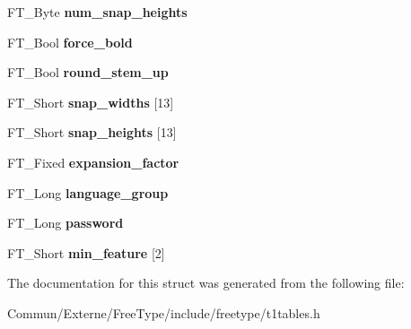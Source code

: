\begin{DoxyCompactItemize}
\item 
F\+T\+\_\+\+Byte {\bfseries num\+\_\+snap\+\_\+heights}\hypertarget{struct_p_s___private_rec___a53f7cfd204400a00eb7203b67d6a1b1c}{}\label{struct_p_s___private_rec___a53f7cfd204400a00eb7203b67d6a1b1c}

\item 
F\+T\+\_\+\+Bool {\bfseries force\+\_\+bold}\hypertarget{struct_p_s___private_rec___a40e62a278e48f47a0f204bd9fa5c883f}{}\label{struct_p_s___private_rec___a40e62a278e48f47a0f204bd9fa5c883f}

\item 
F\+T\+\_\+\+Bool {\bfseries round\+\_\+stem\+\_\+up}\hypertarget{struct_p_s___private_rec___a96b9729811d02146a87ffdc5c254bbe9}{}\label{struct_p_s___private_rec___a96b9729811d02146a87ffdc5c254bbe9}

\item 
F\+T\+\_\+\+Short {\bfseries snap\+\_\+widths} \mbox{[}13\mbox{]}\hypertarget{struct_p_s___private_rec___a39cf1a4b21280bf8082ccba0f4824a8a}{}\label{struct_p_s___private_rec___a39cf1a4b21280bf8082ccba0f4824a8a}

\item 
F\+T\+\_\+\+Short {\bfseries snap\+\_\+heights} \mbox{[}13\mbox{]}\hypertarget{struct_p_s___private_rec___a3583caf0cc05de2afac098574ed0bc4b}{}\label{struct_p_s___private_rec___a3583caf0cc05de2afac098574ed0bc4b}

\item 
F\+T\+\_\+\+Fixed {\bfseries expansion\+\_\+factor}\hypertarget{struct_p_s___private_rec___a45cf6e07c4c26f029e66998e6cad9fa0}{}\label{struct_p_s___private_rec___a45cf6e07c4c26f029e66998e6cad9fa0}

\item 
F\+T\+\_\+\+Long {\bfseries language\+\_\+group}\hypertarget{struct_p_s___private_rec___afc2a7f950a174577ebfc062bb1598f5c}{}\label{struct_p_s___private_rec___afc2a7f950a174577ebfc062bb1598f5c}

\item 
F\+T\+\_\+\+Long {\bfseries password}\hypertarget{struct_p_s___private_rec___a309a871cdeb6f658d8fbff23fa13b667}{}\label{struct_p_s___private_rec___a309a871cdeb6f658d8fbff23fa13b667}

\item 
F\+T\+\_\+\+Short {\bfseries min\+\_\+feature} \mbox{[}2\mbox{]}\hypertarget{struct_p_s___private_rec___af8c829e03c424b1f12b2c9cd4041a868}{}\label{struct_p_s___private_rec___af8c829e03c424b1f12b2c9cd4041a868}

\end{DoxyCompactItemize}


The documentation for this struct was generated from the following file\+:\begin{DoxyCompactItemize}
\item 
Commun/\+Externe/\+Free\+Type/include/freetype/t1tables.\+h\end{DoxyCompactItemize}
